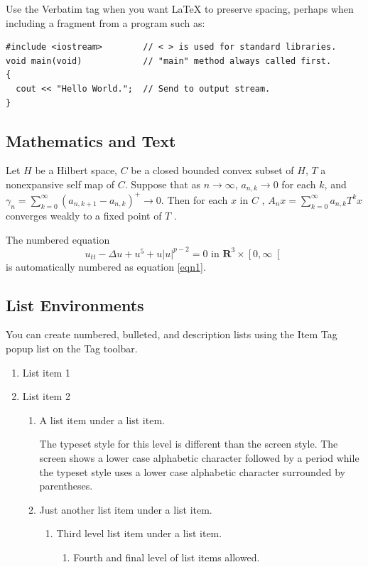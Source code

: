 \documentclass{article}
\begin{document}
Use the Verbatim tag when you want \LaTeX{} to preserve spacing, perhaps
when including a fragment from a program such as:
\begin{verbatim}
#include <iostream>        // < > is used for standard libraries.
void main(void)            // "main" method always called first.
{
  cout << "Hello World.";  // Send to output stream.
}
\end{verbatim}

\subsection{Mathematics and Text}

Let $H$ be a Hilbert space, $C$ be a closed bounded convex subset of $H$, $T$
a nonexpansive self map of $C$. Suppose that as $n\rightarrow \infty $, $%
a_{n,k}\rightarrow 0$ for each $k$, and $\gamma _{n}=\sum_{k=0}^{\infty
}\left( a_{n,k+1}-a_{n,k}\right) ^{+}\rightarrow 0$. Then for each $x$ in $C$%
, $A_{n}x=\sum_{k=0}^{\infty }a_{n,k}T^{k}x$ converges weakly to a fixed
point of $T$ .

The numbered equation 
\begin{equation}
u_{tt}-\Delta u+u^{5}+u\left| u\right| ^{p-2}=0\text{ in }\mathbf{R}%
^{3}\times \left[ 0,\infty \right[  \label{eqn1}
\end{equation}
is automatically numbered as equation \ref{eqn1}.

\subsection{List Environments}

You can create numbered, bulleted, and description lists using the Item Tag
popup list on the Tag toolbar.

\begin{enumerate}
\item List item 1

\item List item 2

\begin{enumerate}
\item A list item under a list item.

The typeset style for this level is different than the screen style. The
screen shows a lower case alphabetic character followed by a period while
the typeset style uses a lower case alphabetic character surrounded by
parentheses.

\item Just another list item under a list item.

\begin{enumerate}
\item Third level list item under a list item.

\begin{enumerate}
\item Fourth and final level of list items allowed.
\end{enumerate}
\end{enumerate}
\end{enumerate}
\end{enumerate}
\end{document}

